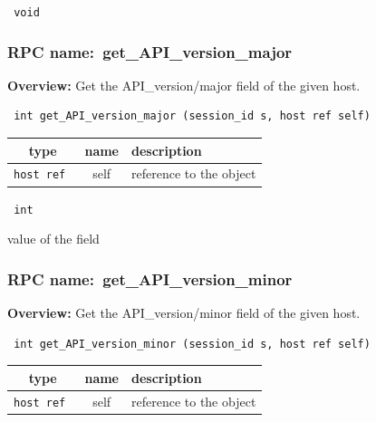 \vspace{0.3cm}

{\tt 
void
}



\vspace{0.3cm}
\vspace{0.3cm}
\vspace{0.3cm}
\subsubsection{RPC name:~get\_API\_version\_major}

{\bf Overview:} 
Get the API\_version/major field of the given host.

\begin{verbatim} int get_API_version_major (session_id s, host ref self)\end{verbatim}



 
\vspace{0.3cm}
\begin{tabular}{|c|c|p{7cm}|}
 \hline
{\bf type} & {\bf name} & {\bf description} \\ \hline
{\tt host ref } & self & reference to the object \\ \hline 

\end{tabular}

\vspace{0.3cm}

{\tt 
int
}


value of the field
\vspace{0.3cm}
\vspace{0.3cm}
\vspace{0.3cm}
\subsubsection{RPC name:~get\_API\_version\_minor}

{\bf Overview:} 
Get the API\_version/minor field of the given host.

\begin{verbatim} int get_API_version_minor (session_id s, host ref self)\end{verbatim}



 
\vspace{0.3cm}
\begin{tabular}{|c|c|p{7cm}|}
 \hline
{\bf type} & {\bf name} & {\bf description} \\ \hline
{\tt host ref } & self & reference to the object \\ \hline 

\end{tabular}

